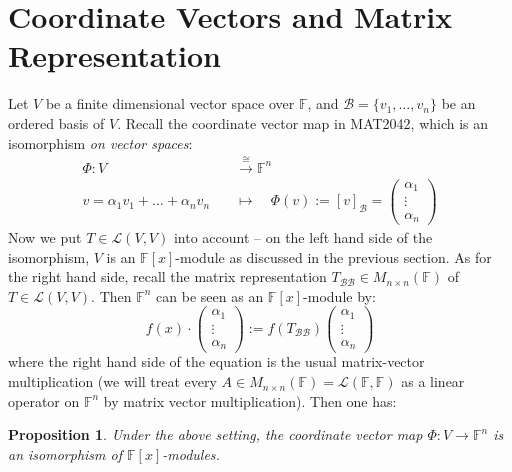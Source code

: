 \documentclass[12pt]{amsbook}
\newtheorem{proposition}[theorem]{Proposition}
\begin{document}
\section{Coordinate Vectors and Matrix Representation}   
   Let $V$ be a finite dimensional vector space over $\mathbb{F}$, and $\mathcal{B} = \{v_1, \dots, v_n\}$ be an ordered basis of $V$. Recall the coordinate vector map in MAT2042, which is an isomorphism {\it on vector spaces}:
    \begin{align*}\Phi: V &\xrightarrow{\cong} \mathbb{F}^n \\
    v = \alpha_1 v_1 + \dots + \alpha_n v_n \quad &\mapsto \quad \Phi(v) := [v]_{\mathcal{B}} = \begin{pmatrix}
        \alpha_1 \\ \vdots \\ \alpha_n
    \end{pmatrix} \end{align*}
    Now we put $T \in \mathcal{L}(V,V)$ into account -- on the left hand side of the isomorphism, $V$ is an $\mathbb{F}[x]$-module as discussed in the previous section. As for the right hand side, recall the matrix representation $T_{\mathcal{B}\mathcal{B}} \in M_{n \times n}(\mathbb{F})$ of $T \in \mathcal{L}(V,V)$. Then $\mathbb{F}^n$ can be seen as an $\mathbb{F}[x]$-module by:
        $$f(x) \cdot \begin{pmatrix} \alpha_1 \\ \vdots \\ \alpha_n \end{pmatrix} := f(T_{\mathcal{B}\mathcal{B}})\begin{pmatrix} \alpha_1 \\ \vdots \\ \alpha_n \end{pmatrix}$$
    where the right hand side of the equation is the usual matrix-vector multiplication (we will treat every $A \in M_{n \times n}(\mathbb{F}) = \mathcal{L}(\mathbb{F},\mathbb{F})$ as a linear operator on $\mathbb{F}^n$ by matrix vector multiplication). Then one has:
\begin{proposition}
    Under the above setting, the coordinate vector map $\Phi: V \longrightarrow \mathbb{F}^n$ is an isomorphism of $\mathbb{F}[x]$-modules.
\end{proposition}
\end{document}
